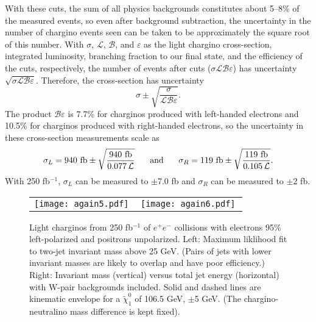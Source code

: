 \documentclass[12pt]{article}
\begin{document}
With these cuts, the sum of all physics backgrounds constitutes about
5--8\% of the measured events, so even after background subtraction,
the uncertainty in the number of chargino events seen can be taken to
be approximately the square root of this number.  With $\sigma$,
$\mathcal{L}$, $\mathcal{B}$, and $\varepsilon$ as the light chargino
cross-section, integrated luminosity, branching fraction to our final
state, and the efficiency of the cuts, respectively, the number of
events after cuts ($\sigma\mathcal{L}\mathcal{B}\varepsilon$) has
uncertainty $\sqrt{\sigma\mathcal{L}\mathcal{B}\varepsilon}$.
Therefore, the cross-section has uncertainty
\begin{equation}
  \sigma \pm \sqrt{\frac{\sigma}{\mathcal{L}\mathcal{B}\varepsilon}}.
\end{equation}
The product $\mathcal{B}\varepsilon$ is 7.7\% for charginos produced
with left-handed electrons and 10.5\% for charginos produced with
right-handed electrons, so the uncertainty in these cross-section
measurements scale as
\begin{equation}
  \sigma_L = 940\mbox{ fb} \pm \sqrt{\frac{940\mbox{ fb}}{0.077 \, \mathcal{L}}}
  \mbox{\hspace{0.5 cm} and \hspace{0.5 cm}}
  \sigma_R = 119\mbox{ fb} \pm \sqrt{\frac{119\mbox{ fb}}{0.105 \, \mathcal{L}}}.
\end{equation}
With 250 fb$^{-1}$, $\sigma_L$ can be measured to $\pm$7.0 fb and
$\sigma_R$ can be measured to $\pm$2 fb.

\begin{figure}[t]
  \begin{center}
    \begin{tabular}{p{0.49\linewidth} p{0.49\linewidth}}
      \begin{minipage}{\linewidth} \texttt{[image: again5.pdf]} \end{minipage} &
      \begin{minipage}{\linewidth} \texttt{[image: again6.pdf]} \end{minipage}
    \end{tabular}
    \caption{Light charginos from 250 fb$^{-1}$ of $e^+e^-$ collisions
    with electrons 95\% left-polarized and positrons unpolarized.
    Left: Maximum liklihood fit to two-jet invariant mass above 25
    GeV.  (Pairs of jets with lower invariant masses are likely to
    overlap and have poor efficiency.)  Right: Invariant mass
    (vertical) versus total jet energy (horizontal) with W-pair
    backgrounds included.  Solid and dashed lines are kinematic
    envelope for a $\tilde{\chi}^0_1$ of 106.5 GeV, $\pm$5 GeV.  (The
    chargino-neutralino mass difference is kept fixed).}
    \label{jimpcharginoanal}
  \end{center}
\end{figure}
\end{document}
